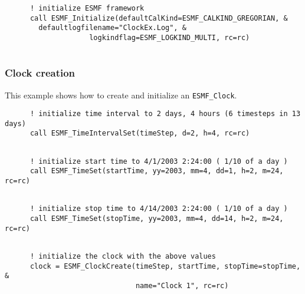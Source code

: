 
 \begin{verbatim}
      ! initialize ESMF framework
      call ESMF_Initialize(defaultCalKind=ESMF_CALKIND_GREGORIAN, &
        defaultlogfilename="ClockEx.Log", &
                    logkindflag=ESMF_LOGKIND_MULTI, rc=rc)
 
\end{verbatim}
 

  \subsubsection{Clock creation}
 
   This example shows how to create and initialize an {\tt ESMF\_Clock}. 

 \begin{verbatim}
      ! initialize time interval to 2 days, 4 hours (6 timesteps in 13 days)
      call ESMF_TimeIntervalSet(timeStep, d=2, h=4, rc=rc)
 
\end{verbatim}
 

 \begin{verbatim}
      ! initialize start time to 4/1/2003 2:24:00 ( 1/10 of a day )
      call ESMF_TimeSet(startTime, yy=2003, mm=4, dd=1, h=2, m=24, rc=rc)
 
\end{verbatim}
 

 \begin{verbatim}
      ! initialize stop time to 4/14/2003 2:24:00 ( 1/10 of a day )
      call ESMF_TimeSet(stopTime, yy=2003, mm=4, dd=14, h=2, m=24, rc=rc)
 
\end{verbatim}
 

 \begin{verbatim}
      ! initialize the clock with the above values
      clock = ESMF_ClockCreate(timeStep, startTime, stopTime=stopTime, &
                               name="Clock 1", rc=rc)
 
\end{verbatim}
 

